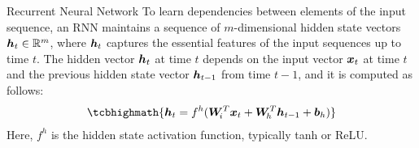 \begin{frame}{Recurrent Neural Network}
To learn dependencies between elements of the input sequence, an RNN maintains
a sequence of $m$-dimensional hidden state vectors ${\boldsymbol h}_t \in {\mathord{\mathbb R}}^m$, where
${\boldsymbol h}_t$ captures the essential features of the input sequences up to time
$t$.%
The hidden vector ${\boldsymbol h}_t$
at time $t$ depends on the input vector ${\boldsymbol x}_t$ at time $t$ and the previous
hidden state vector ${\boldsymbol h}_{t-1}$ from time $t-1$, and it is computed as follows:
\begin{align*}
   \tcbhighmath{
   \bh_t = f^h(\bW_{\!i}^T \bx_t + \bW_{\!h}^T
\bh_{t-1} + \bb_{h})}
\end{align*}
Here, $f^h$ is the hidden state activation function, typically tanh or ReLU. 
% 

\vspace{0.7in}
\centerline{
}
\end{frame}
